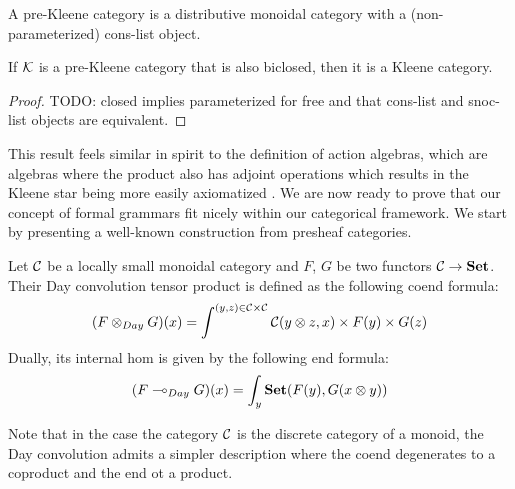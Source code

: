 \documentclass[acmsmall,anonymous,review,screen]{acmart}
\newcommand{\cat}[1]{
  \relax
  \StrLen{#1}[\arglength]
  \ifnum\arglength=1
  \mathcal{#1}
  \else
  \mathbf{#1}
  \fi
}
\newcommand{\Set}{\cat{Set}}
\newcommand{\lto}{\multimap}
\begin{document}
\begin{definition}
  A pre-Kleene category is a distributive monoidal category with a (non-parameterized) cons-list object.
\end{definition}

\begin{theorem}
  If $\cat K$ is a pre-Kleene category that is also biclosed, then it is a Kleene category.
\end{theorem}
\begin{proof}
  TODO: closed implies parameterized for free and that cons-list and snoc-list objects are equivalent.
\end{proof}




This result feels similar in spirit to the definition of action
algebras, which are algebras where the product also has adjoint
operations which results in the Kleene star being more easily
axiomatized \cite{kozen1994}. We are now ready to prove that our
concept of formal grammars fit nicely within our categorical
framework. We start by presenting a well-known construction
from presheaf categories.

\begin{definition}
  Let $\cat{C}$ be a locally small monoidal category and $F$, $G$ be
  two functors $\cat{C} \to \Set$. Their Day convolution tensor
  product is defined as the following coend formula:
  \[
  (F \otimes_{Day} G)(x) = \int^{(y,z) \in \cat{C}\times\cat{C}}\cat{C}(y\otimes z, x) \times F(y) \times G(z) 
  \]
  Dually, its internal hom is given by the following end formula:
  \[
  (F \lto_{Day} G)(x) = \int_{y} \Set(F(y), G(x \otimes y))
  \]
\end{definition}
Note that in the case the category $\cat C$ is the discrete category
of a monoid, the Day convolution admits a simpler description where
the coend degenerates to a coproduct and the end ot a product.
\end{document}
